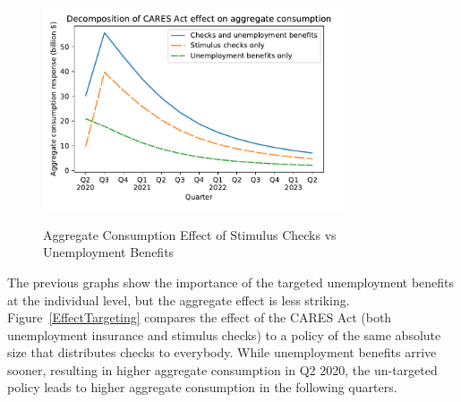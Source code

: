 \documentclass[titlepage,letterpaper]{\econtex}
\begin{document}
\begin{figure}
  \centering
  \caption{Aggregate Consumption Effect of Stimulus Checks vs Unemployment Benefits}
  \label{checks_vs_unemp}
  { \includegraphics[width=0.8\textwidth]{./Figures/Checks_vs_Unemp}}
\end{figure}

The previous graphs show the importance of the targeted unemployment benefits at the individual level, but the aggregate effect is less striking.
Figure~\ref{EffectTargeting} compares the effect of the CARES Act (both unemployment insurance and stimulus checks) to a policy of the same absolute size that distributes checks to everybody.
While unemployment benefits arrive sooner, resulting in higher aggregate consumption in Q2 2020, the un-targeted policy leads to higher aggregate consumption in the following quarters.
\end{document}
